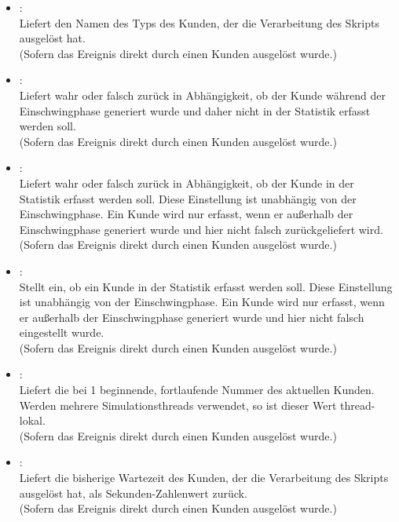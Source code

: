 \begin{itemize}

\item
{}:\\
Liefert den Namen des Typs des Kunden, der die Verarbeitung des Skripts ausgelöst hat.\\
(Sofern das Ereignis direkt durch einen Kunden ausgelöst wurde.)

\item
{}:\\
Liefert wahr oder falsch zurück in Abhängigkeit, ob der Kunde während der Einschwingphase generiert wurde und
daher nicht in der Statistik erfasst werden soll.\\
(Sofern das Ereignis direkt durch einen Kunden ausgelöst wurde.)
	
\item
{}:\\
Liefert wahr oder falsch zurück in Abhängigkeit, ob der Kunde in der Statistik erfasst werden soll.
Diese Einstellung ist unabhängig von der Einschwingphase. Ein Kunde wird nur erfasst, wenn er außerhalb
der Einschwingphase generiert wurde und hier nicht falsch zurückgeliefert wird.\\
(Sofern das Ereignis direkt durch einen Kunden ausgelöst wurde.)
  
\item
{}:\\
Stellt ein, ob ein Kunde in der Statistik erfasst werden soll.
Diese Einstellung ist unabhängig von der Einschwingphase. Ein Kunde wird nur erfasst, wenn er außerhalb
der Einschwingphase generiert wurde und hier nicht falsch eingestellt wurde.\\
(Sofern das Ereignis direkt durch einen Kunden ausgelöst wurde.)
  
\item
{}:\\
Liefert die bei 1 beginnende, fortlaufende Nummer des aktuellen Kunden.
Werden mehrere Simulationsthreads verwendet, so ist dieser Wert thread-lokal.\\
(Sofern das Ereignis direkt durch einen Kunden ausgelöst wurde.)

\item
{}:\\
Liefert die bisherige Wartezeit des Kunden, der die Verarbeitung des Skripts ausgelöst hat, als Sekunden-Zahlenwert zurück.\\
(Sofern das Ereignis direkt durch einen Kunden ausgelöst wurde.)


\end{itemize}
